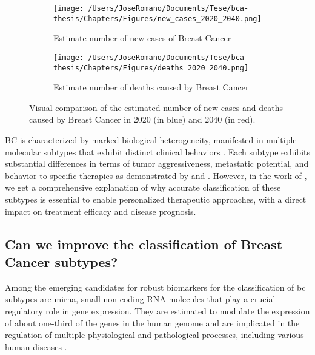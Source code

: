 \begin{figure}[h!]
  \centering
  \begin{subfigure}[b]{0.45\textwidth}
    \centering
    \texttt{[image: /Users/JoseRomano/Documents/Tese/bca-thesis/Chapters/Figures/new\_cases\_2020\_2040.png]}
    \caption{Estimate number of new cases of Breast Cancer}
    \label{fig:new_cases_2020_2040}
  \end{subfigure}
  \vspace{0.5cm}
  \begin{subfigure}[b]{0.45\textwidth}
    \centering
    \texttt{[image: /Users/JoseRomano/Documents/Tese/bca-thesis/Chapters/Figures/deaths\_2020\_2040.png]}
    \caption{Estimate number of deaths caused by Breast Cancer}
    \label{fig:deaths_2020_2040}
  \end{subfigure}
  \caption{Visual comparison of the estimated number of new cases and deaths caused by Breast Cancer
    in 2020 (in blue) and 2040 (in red). \cite{GLOBOCAN2022}}
  \label{fig:estimates_2020_2040}
\end{figure}

BC is characterized by marked biological heterogeneity, manifested in multiple
molecular subtypes that exhibit distinct clinical behaviors . Each subtype
exhibits substantial differences in terms of tumor aggressiveness, metastatic
potential, and behavior to specific therapies as demonstrated by
\textcite{bc_subtypes_Prat2015Clinical} and \textcite{bc_molecular_Perou2000}.
However, in the work of \textcite{need_for_subtype_treatments_Testa2020Breast},
we get a comprehensive explanation of why accurate classification of these
subtypes is essential to enable personalized therapeutic approaches, with a
direct impact on treatment efficacy and disease prognosis.

\subsection{Can we improve the classification of Breast Cancer subtypes?}
Among the emerging candidates for robust biomarkers for the classification of
\gls{bc} subtypes are \gls{mirna}, small non-coding RNA molecules that play a
crucial regulatory role in gene expression. They are estimated to modulate the
expression of about one-third of the genes in the human genome
\cite{mirna_importance_Hammond2015An} and are implicated in the regulation of
multiple physiological and pathological processes, including various human
diseases \cite{mirna_as_biomarkers_Ho2022}.

